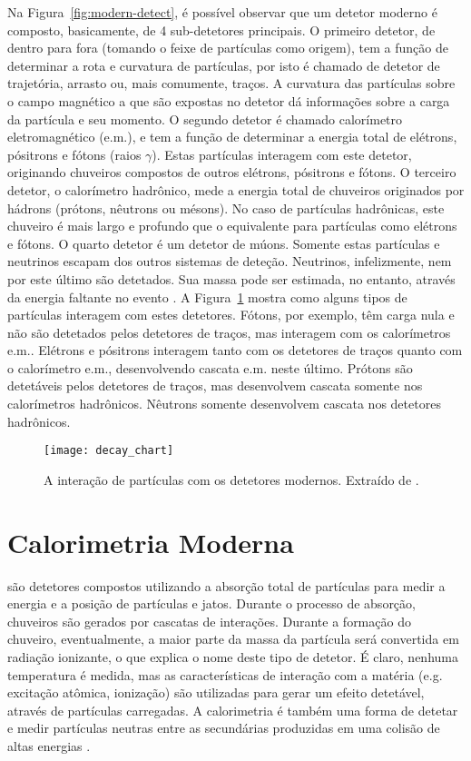 Na Figura~\ref{fig:modern-detect}, é possível observar que um detetor moderno
é composto, basicamente, de 4 sub-detetores principais. O primeiro detetor, de
dentro para fora (tomando o feixe de partículas como origem), tem a função de
determinar a rota e curvatura de partículas, por isto é chamado de detetor de
trajetória, arrasto ou, mais comumente, traços. A curvatura das partículas
sobre o campo magnético a que são expostas no detetor dá informações sobre a
carga da partícula e seu momento. O segundo detetor é chamado calorímetro
eletromagnético (e.m.), e tem a função de determinar a energia total de
elétrons, pósitrons e fótons (raios $\gamma$). Estas partículas interagem com
este detetor, originando chuveiros compostos de outros elétrons, pósitrons e
fótons. O terceiro detetor, o calorímetro hadrônico, mede a energia total de
chuveiros originados por hádrons (prótons, nêutrons ou mésons). No caso de
partículas hadrônicas, este chuveiro é mais largo e profundo que o equivalente
para partículas como elétrons e fótons. O quarto detetor é um detetor de
múons. Somente estas partículas e neutrinos escapam dos outros sistemas de
deteção. Neutrinos, infelizmente, nem por este último são detetados. Sua massa
pode ser estimada, no entanto, através da energia faltante no evento
\cite{atlas-tp}. A Figura~\ref{fig:decay} mostra como alguns tipos de
partículas interagem com estes detetores. Fótons, por exemplo, têm carga nula
e não são detetados pelos detetores de traços, mas interagem com os
calorímetros e.m.. Elétrons e pósitrons interagem tanto com os detetores de
traços quanto com o calorímetro e.m., desenvolvendo cascata e.m. neste
último. Prótons são detetáveis pelos detetores de traços, mas desenvolvem
cascata somente nos calorímetros hadrônicos. Nêutrons somente desenvolvem
cascata nos detetores hadrônicos.

\begin{figure}
\begin{center}
\texttt{[image: decay\_chart]}
\end{center}
\caption{A interação de partículas com os detetores modernos. Extraído de
\cite{partadv}.} 
\label{fig:decay}
\end{figure}

\section{Calorimetria Moderna}
\label{sec:calorimetria}

 são detetores compostos utilizando a absorção
total de partículas para medir a energia e a posição de partículas e
jatos. Durante o processo de absorção, chuveiros são gerados por cascatas de
interações. Durante a formação do chuveiro, eventualmente, a maior parte da
massa da partícula será convertida em radiação ionizante, o que explica o nome
deste tipo de detetor. É claro, nenhuma temperatura é medida, mas as
características de interação com a matéria (e.g. excitação atômica, ionização)
são utilizadas para gerar um efeito detetável, através de partículas
carregadas. A calorimetria é também uma forma de detetar e medir partículas
neutras entre as secundárias produzidas em uma colisão de altas energias
\cite{bock:detector}.

